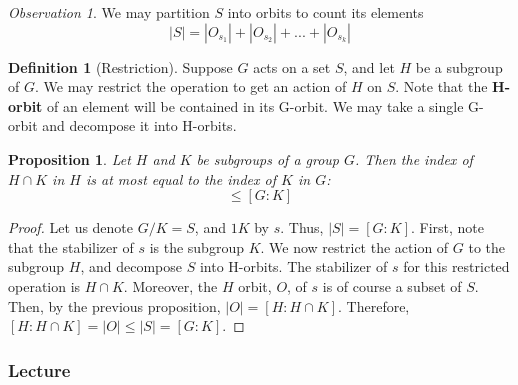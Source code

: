 \documentclass[12pt]{article}
\newtheorem{prop}[thm]{Proposition}
\theoremstyle{definition}
\newtheorem{defn}[thm]{Definition}
\theoremstyle{remark}
\newtheorem{obs}[thm]{Observation}
\numberwithin{equation}{section}
\newcommand\B[1]{\textbf{ #1}}
\begin{document}
\vspace{15pt}

\begin{obs}
        We may partition $S$ into orbits to count its elements \begin{equation}
                |S| = |O_{s_1}| + |O_{s_2}| + ... + |O_{s_k}|
        \end{equation}
\end{obs}

\vspace{15pt}

\begin{defn}[Restriction]
        Suppose $G$ acts on a set $S$, and let $H$ be a subgroup of $G$. We may restrict the operation to get an action of $H$ on $S$. Note that the \B{H-orbit} of an element will be contained in its G-orbit. We may take a single G-orbit and decompose it into H-orbits. 
\end{defn}

\vspace{15pt}


\begin{prop}
        Let $H$ and $K$ be subgroups of a group $G$. Then the index of $H \cap K$ in $H$ is at most equal to the index of $K$ in $G$: \begin{equation}
                [H:H\cap K]\leq [G:K]
        \end{equation}
\end{prop}
\begin{proof}
        Let us denote $G/K = S$, and $1K$ by $s$. Thus, $|S| = [G:K]$. First, note that the stabilizer of $s$ is the subgroup $K$. We now restrict the action of $G$ to the subgroup $H$, and decompose $S$ into H-orbits. The stabilizer of $s$ for this restricted operation is $H \cap K$. Moreover, the $H$ orbit, $O$, of $s$ is of course a subset of $S$. Then, by the previous proposition, $|O| = [H:H\cap K]$. Therefore, $[H:H\cap K] = |O| \leq |S| = [G:K]$.
\end{proof}

\subsubsection{Lecture}
\end{document}
